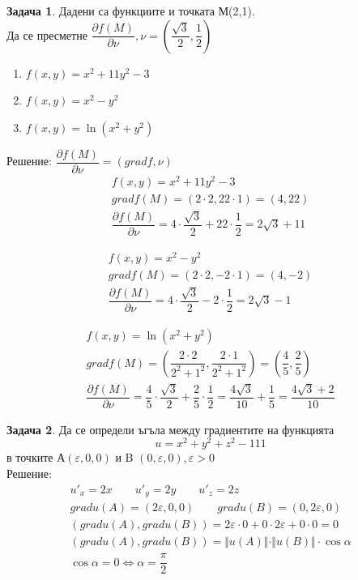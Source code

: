 \documentclass[a4paper,fleqn,12pt]{article}
\theoremstyle{definition}
\newtheorem{task}{Задача}[subsection]
\begin{document}
\begin{task}
Дадени са функциите и точката М(2,1). \\
Да се пресметне $\dfrac{\partial f(M)}{\partial \nu}, \nu = \left( \dfrac{\sqrt{3}}{2} , \dfrac{1}{2}\right)$ 
\begin{enumerate}
\item $ f(x,y) = x^2 + 11y^2 - 3$
\item $ f(x,y) = x^2 - y^2$
\item $ f(x,y) = \ln{(x^2 + y^2)}$
\end{enumerate}
Решение: $\dfrac{\partial f(M)}{\partial \nu} = (grad f, \nu)$
\begin{gather*}
 f(x,y) = x^2 + 11y^2 - 3\\
gradf(M) = (2\cdot 2, 22 \cdot 1) = (4,22)\\
\dfrac{\partial f(M)}{\partial \nu} = 4 \cdot \dfrac{\sqrt{3}}{2} + 22 \cdot \dfrac{1}{2} = 2\sqrt{3} + 11
\end{gather*}

\begin{gather*}
f(x,y) = x^2 - y^2\\
gradf(M) = (2\cdot 2, -2 \cdot 1) = (4,-2)\\
\dfrac{\partial f(M)}{\partial \nu} = 4 \cdot \dfrac{\sqrt{3}}{2} -2 \cdot \dfrac{1}{2} = 2\sqrt{3} - 1
\end{gather*}

\begin{gather*}
f(x,y) = \ln{(x^2 + y^2)}\\
gradf(M) = \left(\dfrac{2 \cdot 2}{2^2+1^2}, \dfrac{2 \cdot 1}{2^2+1^2} \right) = \left(\dfrac{4}{5} , \dfrac{2}{5} \right) \\
\dfrac{\partial f(M)}{\partial \nu} = \dfrac{4}{5} \cdot \dfrac{\sqrt{3}}{2} + \dfrac{2}{5} \cdot \dfrac{1}{2} = \dfrac{4\sqrt{3}}{10} + \dfrac{1}{5} = \dfrac{4\sqrt{3} + 2}{10}
\end{gather*}

\end{task}

\begin{task}
Да се определи ъгъла между градиентите на функцията 
$$u = x^2 + y^2 + z^2 - 111$$
в точките А$(\varepsilon,0,0)$ и B $(0,\varepsilon,0), \varepsilon >0$\\
Решение: 
\begin{gather*}
u'_x = 2x \qquad u'_y = 2y \qquad u'_z = 2z \\
grad u(A) = (2\varepsilon,0,0) \qquad grad u(B) = (0,2\varepsilon,0) \\
(grad u(A), grad u(B))= 2\varepsilon \cdot 0 + 0 \cdot 2\varepsilon + 0 \cdot 0 = 0 \\
(grad u(A), grad u(B)) = \Vert u(A) \Vert \cdot \Vert u(B) \Vert \cdot \cos{\alpha} \\
\cos{\alpha} = 0 \Leftrightarrow \alpha = \dfrac{\pi}{2}
\end{gather*}
\end{task}
\end{document}
